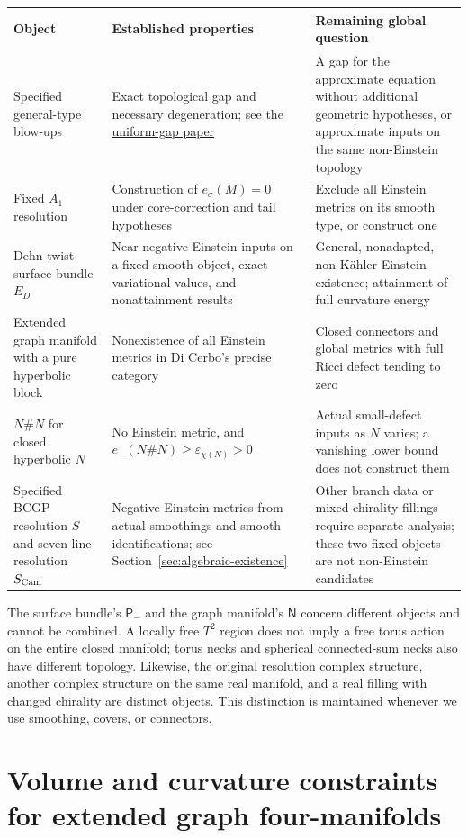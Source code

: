 \documentclass[a4paper,11pt]{article}
\numberwithin{equation}{section}
\theoremstyle{definition}
\begin{document}
\begin{longtable}{L{.22\textwidth}L{.34\textwidth}L{.35\textwidth}}
\toprule Object & Established properties & Remaining global question\\\midrule\endhead
Specified general-type blow-ups & Exact topological gap and necessary degeneration; see the \href{20260916_uniform_gap.tex}{uniform-gap paper} & A gap for the approximate equation without additional geometric hypotheses, or approximate inputs on the same non-Einstein topology\\
Fixed $A_1$ resolution & Construction of $e_\sigma(M)=0$ under core-correction and tail hypotheses & Exclude all Einstein metrics on its smooth type, or construct one\\
Dehn-twist surface bundle $E_D$ & Near-negative-Einstein inputs on a fixed smooth object, exact variational values, and nonattainment results & General, nonadapted, non-K\"ahler Einstein existence; attainment of full curvature energy\\
Extended graph manifold with a pure hyperbolic block & Nonexistence of all Einstein metrics in Di Cerbo's precise category & Closed connectors and global metrics with full Ricci defect tending to zero\\
$N\#N$ for closed hyperbolic $N$ & No Einstein metric, and $e_-(N\#N)\ge\varepsilon_{\chi(N)}>0$ & Actual small-defect inputs as $N$ varies; a vanishing lower bound does not construct them\\
Specified BCGP resolution $S$ and seven-line resolution $S_{\rm Cam}$ & Negative Einstein metrics from actual smoothings and smooth identifications; see Section~\ref{sec:algebraic-existence} & Other branch data or mixed-chirality fillings require separate analysis; these two fixed objects are not non-Einstein candidates\\\bottomrule
\end{longtable}
The surface bundle's $\mathsf P_-$ and the graph manifold's $\mathsf N$ concern different objects and cannot be combined. A locally free $T^2$ region does not imply a free torus action on the entire closed manifold; torus necks and spherical connected-sum necks also have different topology.
Likewise, the original resolution complex structure, another complex structure on the same real manifold, and a real filling with changed chirality are distinct objects. This distinction is maintained whenever we use smoothing, covers, or connectors.

\section{Volume and curvature constraints for extended graph four-manifolds}\label{sec:graph-budget}
\end{document}
